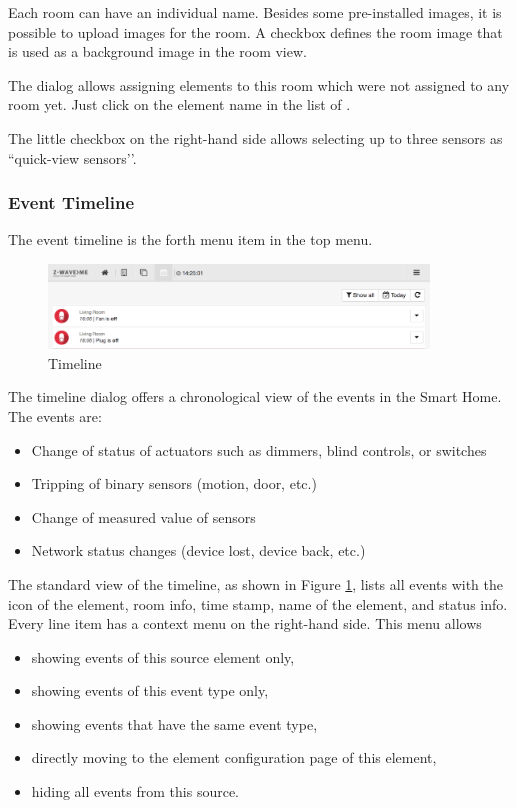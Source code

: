 Each room can have an individual name. Besides some pre-installed images, it is possible 
to upload images for the room. A checkbox defines the room image that is used as a 
background image in the room view.

The dialog allows assigning elements to this room which were not assigned to any room 
yet. Just click on the element name in the list of .

The little checkbox on the right-hand side allows selecting up to three sensors as 
``quick-view sensors’’.

\subsubsection{Event Timeline}
\label{timeline}

The event timeline is the forth menu item in the top menu.

\begin{figure}
\begin{center}
\includegraphics[width=0.9\textwidth]{pngs/cap4/sh8.png}
\caption{Timeline}
\label{sh8}
\end{center}
\end{figure}

The timeline dialog offers a chronological view of the events in the Smart Home. The events 
are:

\begin{itemize}
\item Change of status of actuators such as dimmers, blind controls, or switches
\item Tripping of binary sensors (motion, door, etc.)
\item Change of measured value of sensors
\item Network status changes (device lost, device back, etc.)
\end{itemize}

The standard view of the timeline, as shown in Figure \ref{sh8}, lists all events with the 
icon of the element, room info, time stamp, name of the element, and status info. Every 
line item has a context menu on the right-hand side. This menu allows

\begin{itemize}
\item showing events of this source element only,
\item showing events of this event type only,
\item showing events that have the same event type,
\item directly moving to the element configuration page of this element,
\item hiding all events from this source.
\end{itemize}

